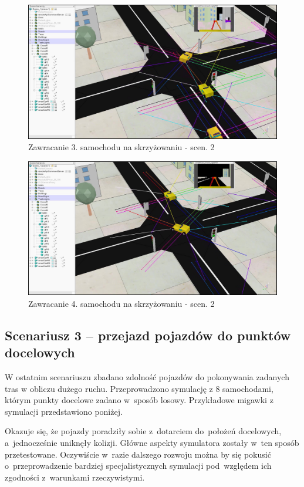 \begin{figure}[H]
	\centering
	\centering
	\includegraphics[width=.8\linewidth]{p24.jpg}
	\caption{Zawracanie 3. samochodu na skrzyżowaniu - scen. 2}
	\label{fig:p24}
\end{figure}

\begin{figure}[H]
	\centering
	\centering
	\includegraphics[width=.8\linewidth]{p25.jpg}
	\caption{Zawracanie 4. samochodu na skrzyżowaniu - scen. 2}
	\label{fig:p25}
\end{figure}

\subsection{Scenariusz 3 -- przejazd pojazdów do punktów docelowych}
 
W ostatnim scenariuszu zbadano zdolność pojazdów do pokonywania zadanych tras w obliczu dużego ruchu. Przeprowadzono symulację z 8 samochodami, którym punkty docelowe zadano w~sposób losowy. Przykładowe migawki z symulacji przedstawiono poniżej.
  
Okazuje się, że pojazdy poradziły sobie z~dotarciem do~położeń docelowych, a~jednocześnie uniknęły kolizji. Główne aspekty symulatora zostały w~ten sposób przetestowane. Oczywiście w~razie dalszego rozwoju można by się pokusić o~przeprowadzenie bardziej specjalistycznych symulacji pod~względem ich zgodności z~warunkami rzeczywistymi.

